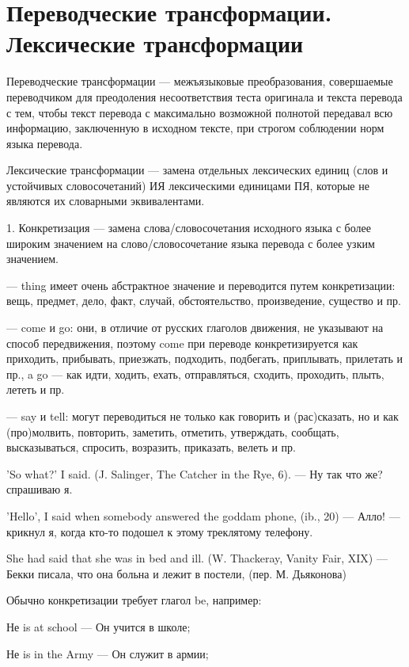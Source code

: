 \section{Переводческие трансформации. Лексические трансформации}

Переводческие трансформации --- межъязыковые преобразования, совершаемые переводчиком для преодоления несоответствия теста оригинала и текста перевода с тем, чтобы текст перевода с максимально возможной полнотой передавал всю информацию, заключенную в исходном тексте, при строгом соблюдении норм языка перевода.

Лексические трансформации --- замена отдельных лексических единиц (слов и устойчивых словосочетаний) ИЯ лексическими единицами ПЯ, которые не являются их словарными эквивалентами. 

1. Конкретизация --- замена слова/словосочетания исходного языка с более широким значением на слово/словосочетание языка перевода с более узким значением. 

--- thing имеет очень абстрактное значение и переводится путем конкретизации: вещь, предмет, дело, факт, случай, обстоятельство, произведение, существо и пр. 

--- come и go: они, в отличие от русских глаголов движения, не указывают на способ передвижения, поэтому come при переводе конкретизируется как приходить, прибывать, приезжать, подходить, подбегать, приплывать, прилетать и пр., a go --- как идти, ходить, ехать, отправляться, сходить, проходить, плыть, лететь и пр.

--- say и tell: могут переводиться не только как говорить и (рас)сказать, но и как (про)молвить, повторить, заметить, отметить, утверждать, сообщать, высказываться, спросить, возразить, приказать, велеть и пр.

'So what?' I said. (J. Salinger, The Catcher in the Rye, 6). --- Ну так что же? спрашиваю я.

'Hello', I said when somebody answered the goddam phone, (ib., 20) --- Алло! --- крикнул я, когда кто-то подошел к этому треклятому телефону.

She had said that she was in bed and ill. (W. Thackeray, Vanity Fair, XIX) --- Бекки писала, что она больна и лежит в постели, (пер. М. Дьяконова)

Обычно конкретизации требует глагол be, например: 

Не is at school --- Он учится в школе;

Не is in the Army --- Он служит в армии;

